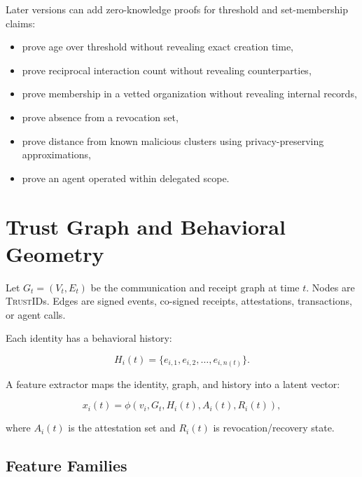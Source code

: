 \documentclass[11pt]{article}
\newcommand{\TrustID}{\textsc{TrustID}}
\begin{document}
Later versions can add zero-knowledge proofs for threshold and set-membership claims:

\begin{itemize}
    \item prove age over threshold without revealing exact creation time,
    \item prove reciprocal interaction count without revealing counterparties,
    \item prove membership in a vetted organization without revealing internal records,
    \item prove absence from a revocation set,
    \item prove distance from known malicious clusters using privacy-preserving approximations,
    \item prove an agent operated within delegated scope.
\end{itemize}

\section{Trust Graph and Behavioral Geometry}

Let \(G_t = (V_t, E_t)\) be the communication and receipt graph at time \(t\). Nodes are \TrustID{}s. Edges are signed events, co-signed receipts, attestations, transactions, or agent calls.

Each identity has a behavioral history:

\begin{equation}
H_i(t) = \{e_{i,1}, e_{i,2}, \ldots, e_{i,n(t)}\}.
\end{equation}

A feature extractor maps the identity, graph, and history into a latent vector:

\begin{equation}
    x_i(t) = \phi(v_i, G_t, H_i(t), A_i(t), R_i(t)),
\end{equation}

where \(A_i(t)\) is the attestation set and \(R_i(t)\) is revocation/recovery state.

\subsection{Feature Families}
\end{document}

